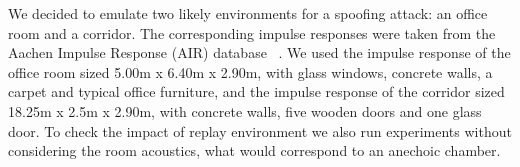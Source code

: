We decided to emulate two likely environments for a spoofing attack: an office room and a corridor. The corresponding impulse responses were taken from the Aachen Impulse Response (AIR) database ~\cite{Jeub2009}. We used the impulse response of the office room sized 5.00m x 6.40m x 2.90m, with glass windows, concrete walls, a carpet and typical office furniture, and the impulse response of the corridor sized 18.25m x 2.5m x 2.90m, with concrete walls, five wooden doors and one glass door. To check the impact of replay environment we also run experiments without considering the room acoustics, what would correspond to an anechoic chamber.

